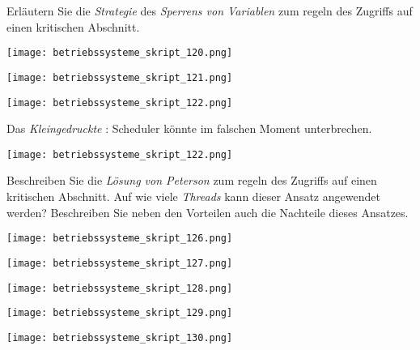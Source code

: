 \documentclass{article}
\begin{document}
\begin{tcolorbox}[colback=white!10!white,colframe=lightgray!75!black,
  savelowerto=\jobname_ex.tex,breakable,enhanced,lines before break=40]

\begin{center}
Erläutern Sie die 
\textit{Strategie
} des 
\textit{Sperrens von Variablen
} zum regeln des Zugriffs auf einen kritischen Abschnitt.

\end{center}

\tcblower

\justifying
\begin{center}
\texttt{[image: betriebssysteme\_skript\_120.png]}
\end{center}
\begin{center}
\texttt{[image: betriebssysteme\_skript\_121.png]}
\end{center}
\begin{center}
\texttt{[image: betriebssysteme\_skript\_122.png]}
\end{center}
Das 
\textit{Kleingedruckte
}: Scheduler könnte im falschen Moment unterbrechen.
\begin{center}
\texttt{[image: betriebssysteme\_skript\_122.png]}
\end{center}

\end{tcolorbox}
\begin{tcolorbox}[colback=white!10!white,colframe=lightgray!75!black,
  savelowerto=\jobname_ex.tex,breakable,enhanced,lines before break=40]

\begin{center}
Beschreiben Sie die 
\textit{Lösung von Peterson
} zum regeln des Zugriffs auf einen kritischen Abschnitt. Auf wie viele 
\textit{Threads
} kann dieser Ansatz angewendet werden? Beschreiben Sie neben den Vorteilen auch die Nachteile dieses Ansatzes.

\end{center}

\tcblower

\justifying
\begin{center}
\texttt{[image: betriebssysteme\_skript\_126.png]}
\end{center}
\begin{center}
\texttt{[image: betriebssysteme\_skript\_127.png]}
\end{center}
\begin{center}
\texttt{[image: betriebssysteme\_skript\_128.png]}
\end{center}
\begin{center}
\texttt{[image: betriebssysteme\_skript\_129.png]}
\end{center}
\begin{center}
\texttt{[image: betriebssysteme\_skript\_130.png]}
\end{center}

\end{tcolorbox}
\end{document}
